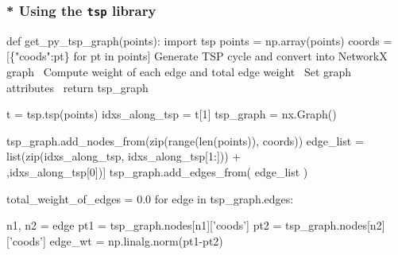 \subsubsection{* Using the \texttt{tsp} library}
\nwenddocs{}\plusendmoddef\nwstartdeflinemarkup{}\nwenddeflinemarkup
def get_py_tsp_graph(points):
     import tsp
     points = np.array(points)
     coords = [\{"coods":pt\} for pt in points]
     \LA{}Generate TSP cycle and convert into NetworkX graph~{\nwtagstyle{}}\RA{}
     \LA{}Compute weight of each edge and total edge weight~{\nwtagstyle{}}\RA{}
     \LA{}Set graph attributes~{\nwtagstyle{}}\RA{}     
     return tsp_graph
\nwendcode{}\nwdocspar


\nwenddocs{}\endmoddef\nwstartdeflinemarkup{}\nwenddeflinemarkup
t              = tsp.tsp(points)
idxs_along_tsp = t[1]
tsp_graph      = nx.Graph()

tsp_graph.add_nodes_from(zip(range(len(points)), coords))
edge_list = list(zip(idxs_along_tsp, idxs_along_tsp[1:])) + \\
                  [(idxs_along_tsp[-1],idxs_along_tsp[0])]
tsp_graph.add_edges_from(  edge_list  )
\nwendcode{}\nwdocspar


\nwenddocs{}\endmoddef\nwstartdeflinemarkup{}\nwenddeflinemarkup
total_weight_of_edges = 0.0
for edge in tsp_graph.edges:

      n1, n2 = edge
      pt1 = tsp_graph.nodes[n1]['coods'] 
      pt2 = tsp_graph.nodes[n2]['coods']
      edge_wt = np.linalg.norm(pt1-pt2)

